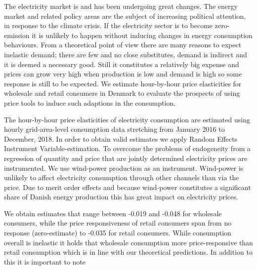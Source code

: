 \label{sec:conclusion}
\begin{comment}
1. Introduktion -> hvorfor spændende; ændret marked 
(2. Tidligere studier -> kobles i stedet for unde resultater) 
3. Teori -> Udbud og efterspørgselskarakteristika 
4. Data ? 
5. Estimation
6. Resultater og diskussion: Måske i kombination med andre initiativer, højere grad af eksponering til de faktiske priser, men stadig meget, der kan undersøges endnu 
\end{comment}
The electricity market is and has been undergoing great changes. The energy market and related policy areas are the subject of increasing political attention, in response to the climate crisis. If the electricity sector is to become zero-emission it is unlikely to happen without inducing changes in energy consumption behaviours. From a theoretical point of view there are many reasons to expect inelastic demand; there are few and no close substitutes, demand is indirect and it is deemed a necessary good. Still it constitutes a relatively big expense and prices can grow very high when production is low and demand is high so some response is still to be expected. We estimate hour-by-hour price elasticities for wholesale and retail consumers in Denmark to evaluate the prospects of using price tools to induce such adaptions in the consumption. 
\bigskip

The hour-by-hour price elasticities of electricity consumption are estimated using hourly grid-area-level consumption data stretching from January 2016 to December, 2018. In order to obtain valid estimates we apply Random Effects Instrument Variable-estimation. To overcome the problems of endogeneity from a regression of quantity and price that are jointly determined electricity prices are instrumented. We use wind-power production as an instrument. Wind-power is unlikely to affect electricity consumption through other channels than via the price. Due to merit order effects and because wind-power constitutes a significant share of Danish energy production this has great impact on electricity prices. 
\bigskip 

We obtain estimates that range between -0.019 and -0.048 for wholesale consumers, while the price responsiveness of retail consumers span from no response (zero-estimate) to -0.035 for retail consumers.  While consumption overall is inelastic it holds that wholesale consumption more price-responsive than retail consumption which is in line with our theoretical predictions. In addition to this it is important to note 

